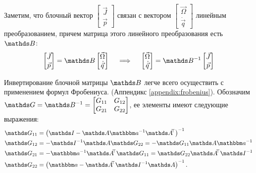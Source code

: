 Заметим, что блочный вектор $\begin{bmatrix} \vec{J} \\ \vec{p} \end{bmatrix}$ связан с вектором $\begin{bmatrix} \vec{\Omega} \\ \dot{\vec{q}} \end{bmatrix}$ линейным преобразованием, причем матрица этого линейного преобразования есть $\bbB$:
\vverh
\begin{gather}
\begin{bmatrix}
\vec{J} \\
\vec{p}
\end{bmatrix}
= \bbB
\begin{bmatrix}
\vec{\Omega} \\
\dot{\vec{q}}
\end{bmatrix}
\quad \implies \quad 
\begin{bmatrix}
\vec{\Omega} \\
\dot{\vec{q}}
\end{bmatrix}
= \bbB^{-1}
\begin{bmatrix}
\vec{J} \\
\vec{p}
\end{bmatrix} \notag
\end{gather}

Инвертирование блочной матрицы $\bbB$ легче всего осуществить с применением формул Фробениуса. (Аппендикс \ref{appendix:frobenius}).
Обозначим $\bbG = \bbB^{-1} = \begin{bmatrix} G_{11} & G_{12} \\ G_{21} & G_{22}
\end{bmatrix}$, ее элементы имеют следующие выражения:
\vverh
\begin{gather}
\begin{aligned}
\bbG_{11} &=  \lb \bbI - \bbA \bba^{-1} \bbA^{\dn \top} \rb^{-1} \\
\bbG_{12} &= - \bbI^{-1} \bbA \bbG_{22} = - \bbG_{11} \bbA \bba^{-1}\\
\bbG_{21} &= - \bba^{-1} \bbA^{\dn \top} \bbG_{11} = \bbG_{22} \bbA^{\dn \top} \bbI^{-1} \\
\bbG_{22} &= \lb \bba - \bbA^{\dn \top} \bbI^{-1} \bbA \rb^{-1}.
\end{aligned}
\notag
\end{gather}

